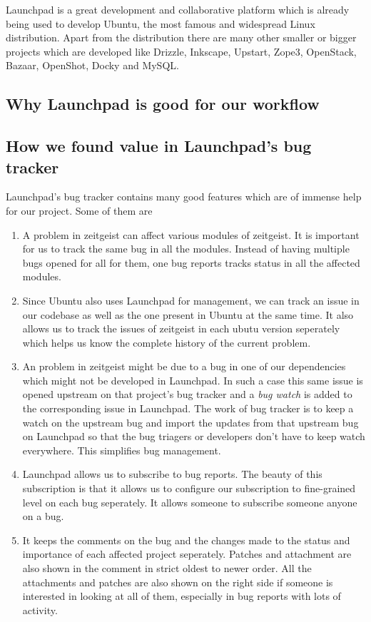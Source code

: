 Launchpad is a great development and collaborative platform which is already being used 
to develop Ubuntu, the most famous and widespread Linux distribution. Apart from the 
distribution there are many other smaller or bigger projects which are developed like 
Drizzle, Inkscape, Upstart, Zope3, OpenStack, Bazaar, OpenShot, Docky and MySQL.

\subsection{Why Launchpad is good for our workflow}
\subsection{How we found value in Launchpad's bug tracker}
Launchpad's bug tracker contains many good features which are of immense help for our 
project. Some of them are
\begin{enumerate}
\item A problem in zeitgeist can affect various modules of zeitgeist. It is important for 
us to track the same bug in all the modules. Instead of having multiple bugs opened for 
all for them, one bug reports tracks status in all the affected modules.
\item Since Ubuntu also uses Launchpad for management, we can track an issue in our codebase 
as well as the one present in Ubuntu at the same time. It also allows us to track the issues 
of zeitgeist in each ubutu version seperately which helps us know the complete history 
of the current problem.
\item An problem in zeitgeist might be due to a bug in one of our dependencies which might 
not be developed in Launchpad. In such a case this same issue is opened upstream on that 
project's bug tracker and a \textit{bug watch} is added to the corresponding issue in Launchpad. 
The work of bug tracker is to keep a watch on the upstream bug and import the updates from that 
upstream bug on Launchpad so that the bug triagers or developers don't have to keep watch 
everywhere. This simplifies bug management.
\item Launchpad allows us to subscribe to bug reports. The beauty of this subscription is that 
it allows us to configure our subscription to fine-grained level on each bug seperately. It 
allows someone to subscribe someone anyone on a bug.
\item It keeps the comments on the bug and the changes made to the status and importance of 
each affected project seperately. Patches and attachment are also shown in the comment in 
strict oldest to newer order. All the attachments and patches are also shown on the right 
side if someone is interested in looking at all of them, especially in bug reports with lots 
of activity.
\end{enumerate}
